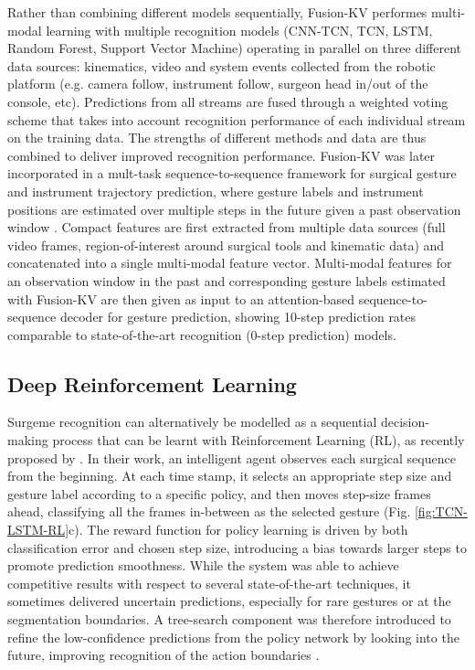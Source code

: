 \documentclass[journal]{IEEEtran}
\begin{document}
Rather than combining different models sequentially, Fusion-KV \cite{Qin2020} performes multi-modal learning with multiple recognition models (CNN-TCN, TCN, LSTM, Random Forest, Support Vector Machine) operating in parallel on three different data sources: kinematics, video and system events collected from the robotic platform (e.g. camera follow, instrument follow, surgeon head in/out of the console, etc). Predictions from all streams are fused through a weighted voting scheme that takes into account recognition performance of each individual stream on the training data. The strengths of different methods and data are thus combined to deliver improved recognition performance. 
Fusion-KV was later incorporated in a mult-task sequence-to-sequence framework for surgical gesture and instrument trajectory prediction, where gesture labels and instrument positions are estimated over multiple steps in the future given a past observation window \cite{Qin2020b}. Compact features are first extracted from multiple data sources (full video frames, region-of-interest around surgical tools and kinematic data) and concatenated into a single multi-modal feature vector. Multi-modal features for an observation window in the past and corresponding gesture labels estimated with Fusion-KV are then given as input to an attention-based sequence-to-sequence decoder for gesture prediction, showing 10-step prediction rates comparable to state-of-the-art recognition (0-step prediction) models.


\subsection{Deep Reinforcement Learning} \label{Reinforcement Learning}

Surgeme recognition can alternatively be modelled as a sequential decision-making process that can be learnt with Reinforcement Learning (RL), as recently proposed by \cite{Liu2018}.
In their work, an intelligent agent observes each surgical sequence from the beginning. At each time stamp, it selects an appropriate step size and gesture label according to a specific policy, and then moves step-size frames ahead, classifying all the frames in-between as the selected gesture (Fig. \ref{fig:TCN-LSTM-RL}c). 
The reward function for policy learning is driven by both classification error and chosen step size, introducing a bias towards larger steps to promote prediction smoothness.
While the system was able to achieve competitive results with respect to several state-of-the-art techniques, it sometimes delivered uncertain predictions, especially for rare gestures or at the segmentation boundaries. 
A tree-search component was therefore introduced to refine the low-confidence predictions from the policy network by looking into the future, improving recognition of the action boundaries \cite{Gao2020}.
\end{document}
